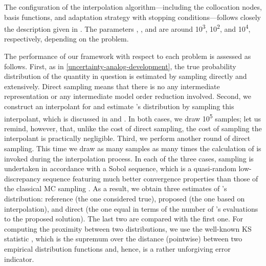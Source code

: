 The configuration of the interpolation algorithm---including the collocation
nodes, basis functions, and adaptation strategy with stopping
conditions---follows closely the description given in
. The parameters , , and
 are around 10\textsuperscript{3}, 10\textsuperscript{2}, and
10\textsuperscript{4}, respectively, depending on the problem.

The performance of our framework with respect to each problem is assessed as
follows. First, as in \cref{uncertainty-analog-development}, the true
probability distribution of the quantity in question \g is estimated by sampling
\g directly and extensively. Direct sampling means that there is no any
intermediate representation or any intermediate model order reduction involved.
Second, we construct an interpolant for \g and estimate \g's distribution by
sampling this interpolant, which is discussed in 
and . In both cases, we draw 10\textsuperscript{5}
samples; let us remind, however, that, unlike the cost of direct sampling, the
cost of sampling the interpolant is practically negligible. Third, we perform
another round of direct sampling. This time we draw as many samples as many
times the calculation of \g is invoked during the interpolation process. In each
of the three cases, sampling is undertaken in accordance with a Sobol sequence,
which is a quasi-random low-discrepancy sequence featuring much better
convergence properties than those of the classical \ac{MC} sampling
\cite{joe2008}. As a result, we obtain three estimates of \g's distribution:
reference (the one considered true), proposed (the one based on interpolation),
and direct (the one equal in terms of the number of \g's evaluations to the
proposed solution). The last two are compared with the first one. For computing
the proximity between two distributions, we use the well-known \ac{KS} statistic
\cite{rao2002}, which is the supremum over the distance (pointwise) between two
empirical distribution functions and, hence, is a rather unforgiving error
indicator.


